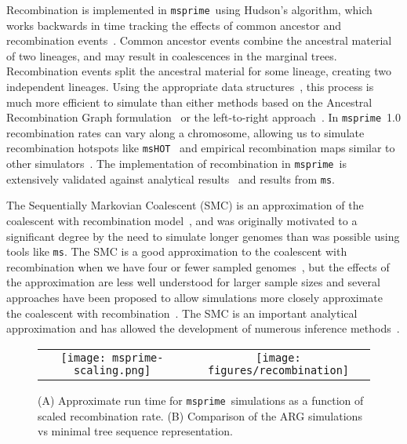 \documentclass{article}
\newcommand{\msprime}[0]{\texttt{msprime}}
\newcommand{\ms}[0]{\texttt{ms}}
\begin{document}
Recombination is implemented in \msprime\ using Hudson's algorithm, which
works backwards in time tracking the
effects of common ancestor and recombination
events~\citep{hudson1983properties,hudson1990gene,kelleher2016efficient}.
Common ancestor events combine the ancestral material of two lineages, and may
result in coalescences in the marginal trees. Recombination events
split the ancestral material for some lineage, creating two independent
lineages. Using the appropriate data structures~\citep{kelleher2016efficient},
this process is much more efficient to simulate than either
methods based on the Ancestral Recombination Graph
formulation~\citep{griffiths1991two,griffiths1997ancestral}
or the left-to-right approach~\citep{wiuf1999recombination,wiuf1999ancestry}.
In \msprime\ 1.0 recombination rates can vary along a chromosome, allowing
us to simulate recombination hotspots like \texttt{msHOT}~\citep{hellenthal2007mshot}
and empirical recombination maps similar to other
simulators~\citep[e.g.][]{shlyakhter2014cosi2}.
The implementation of recombination in \msprime\ is extensively validated
against analytical results~\citep{hudson1983properties,kaplan1985use}
and results from \ms.

The Sequentially Markovian Coalescent (SMC) is an approximation of the
coalescent with recombination
model~\citep{mcvean2005approximating,marjoram2006fast},
and was originally motivated to a significant degree by the need to
simulate longer genomes than was possible using tools like \ms.
The SMC is a good approximation to the
coalescent with recombination when we have four or fewer sampled
genomes~\citep{hobolth2014markovian,wilton2015smc}, but the
effects of the approximation are less well understood for larger
sample sizes and several approaches have been proposed to
allow simulations more closely approximate the coalescent
with recombination~\citep{chen2009fast,wang2014new,staab2015scrm}.
The SMC is an important analytical approximation
and has allowed the development of numerous inference
methods~\citep{
li2011inference,
harris2013inferring,
sheehan2013estimating,
schiffels2014inferring,
carmi2014renewal,
rasmussen2014genome,
zheng2014bayesian,
terhorst2017robust}.

\begin{figure}
\begin{center}
\begin{tabular}{cc}
\texttt{[image: msprime-scaling.png]} &
\texttt{[image: figures/recombination]} \\
\end{tabular}
\end{center}
\caption{\label{fig-recombination-perf}(A) Approximate run time for \msprime\
simulations as a function of scaled recombination rate.
(B) Comparison of the ARG simulations vs minimal tree sequence representation.}
\end{figure}
\end{document}
